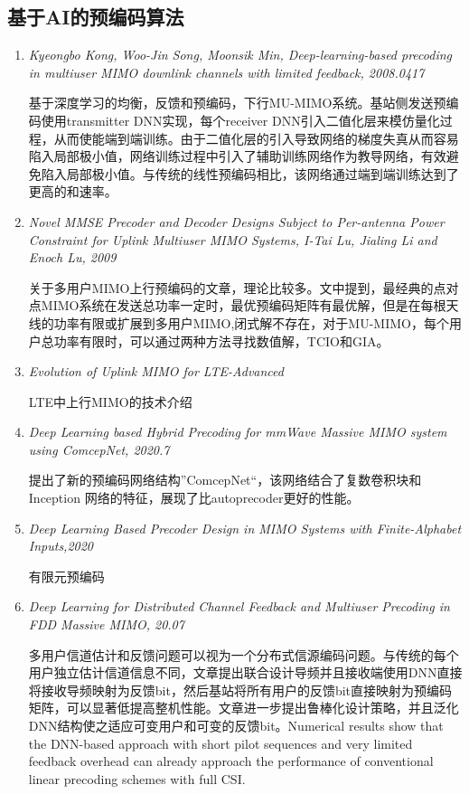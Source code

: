 \subsection{基于AI的预编码算法}
\begin{enumerate}
    \item \emph{Kyeongbo Kong, Woo-Jin Song, Moonsik Min, Deep-learning-based precoding in multiuser MIMO downlink channels with limited feedback, 2008.0417}\par
        基于深度学习的均衡，反馈和预编码，下行MU-MIMO系统。基站侧发送预编码使用transmitter DNN实现，每个receiver DNN引入二值化层来模仿量化过程，从而使能端到端训练。由于二值化层的引入导致网络的梯度失真从而容易陷入局部极小值，网络训练过程中引入了辅助训练网络作为教导网络，有效避免陷入局部极小值。与传统的线性预编码相比，该网络通过端到端训练达到了更高的和速率。
    \item \emph{Novel MMSE Precoder and Decoder Designs Subject to Per-antenna Power Constraint
    for Uplink Multiuser MIMO Systems, I-Tai Lu, Jialing Li and Enoch Lu, 2009}\par
        关于多用户MIMO上行预编码的文章，理论比较多。文中提到，最经典的点对点MIMO系统在发送总功率一定时，最优预编码矩阵有最优解，但是在每根天线的功率有限或扩展到多用户MIMO,闭式解不存在，对于MU-MIMO，每个用户总功率有限时，可以通过两种方法寻找数值解，TCIO和GIA。
    \item \emph{Evolution of Uplink MIMO for LTE-Advanced}\par
        LTE中上行MIMO的技术介绍
    \item \emph{Deep Learning based Hybrid Precoding for mmWave Massive MIMO system using ComcepNet, 2020.7}\par
        提出了新的预编码网络结构”ComcepNet“，该网络结合了复数卷积块和 Inception 网络的特征，展现了比autoprecoder更好的性能。
    \item \emph{Deep Learning Based Precoder Design in MIMO Systems with Finite-Alphabet Inputs,2020}\par 
        有限元预编码
    \item \emph{Deep Learning for Distributed Channel Feedback and Multiuser Precoding in FDD Massive MIMO, 20.07}\par
        多用户信道估计和反馈问题可以视为一个分布式信源编码问题。与传统的每个用户独立估计信道信息不同，文章提出联合设计导频并且接收端使用DNN直接将接收导频映射为反馈bit，然后基站将所有用户的反馈bit直接映射为预编码矩阵，可以显著低提高整机性能。文章进一步提出鲁棒化设计策略，并且泛化DNN结构使之适应可变用户和可变的反馈bit。Numerical results show that the DNN-based approach with short pilot sequences and very limited feedback overhead can already approach the performance of conventional linear precoding schemes with full CSI.

\end{enumerate}
